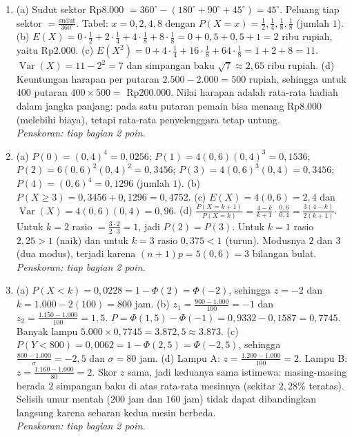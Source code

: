 \documentclass[a4paper,11pt]{article}
\newcounter{no}
\newcommand{\Var}{\operatorname{Var}}
\begin{document}
\par{}\par\vspace{0.2em}
\small\begin{enumerate}[leftmargin=2em,itemsep=3pt,topsep=2pt]
\item[\textbf{1.}] (a) Sudut sektor Rp8.000 $=360^\circ-(180^\circ+90^\circ+45^\circ)=45^\circ$. Peluang tiap sektor $=\frac{\text{sudut}}{360^\circ}$. Tabel: $x=0,2,4,8$ dengan $P(X=x)=\frac12,\frac14,\frac18,\frac18$ (jumlah $1$). (b) $E(X)=0\cdot\frac12+2\cdot\frac14+4\cdot\frac18+8\cdot\frac18=0+0{,}5+0{,}5+1=2$ ribu rupiah, yaitu Rp2.000. (c) $E(X^2)=0+4\cdot\frac14+16\cdot\frac18+64\cdot\frac18=1+2+8=11$. $\Var(X)=11-2^2=7$ dan simpangan baku $\sqrt7\approx2{,}65$ ribu rupiah. (d) Keuntungan harapan per putaran $2.500-2.000=500$ rupiah, sehingga untuk $400$ putaran $400\times500=$ Rp200.000. Nilai harapan adalah rata-rata hadiah dalam jangka panjang: pada satu putaran pemain bisa menang Rp8.000 (melebihi biaya), tetapi rata-rata penyelenggara tetap untung. \\ \textit{Penskoran: tiap bagian 2 poin.}
\item[\textbf{2.}] (a) $P(0)=(0{,}4)^4=0{,}0256$; $P(1)=4(0{,}6)(0{,}4)^3=0{,}1536$; $P(2)=6(0{,}6)^2(0{,}4)^2=0{,}3456$; $P(3)=4(0{,}6)^3(0{,}4)=0{,}3456$; $P(4)=(0{,}6)^4=0{,}1296$ (jumlah $1$). (b) $P(X\ge3)=0{,}3456+0{,}1296=0{,}4752$. (c) $E(X)=4(0{,}6)=2{,}4$ dan $\Var(X)=4(0{,}6)(0{,}4)=0{,}96$. (d) $\frac{P(X=k+1)}{P(X=k)}=\frac{4-k}{k+1}\cdot\frac{0{,}6}{0{,}4}=\frac{3(4-k)}{2(k+1)}$. Untuk $k=2$ rasio $=\frac{3\cdot2}{2\cdot3}=1$, jadi $P(2)=P(3)$. Untuk $k=1$ rasio $2{,}25>1$ (naik) dan untuk $k=3$ rasio $0{,}375<1$ (turun). Modusnya $2$ dan $3$ (dua modus), terjadi karena $(n+1)p=5(0{,}6)=3$ bilangan bulat. \\ \textit{Penskoran: tiap bagian 2 poin.}
\item[\textbf{3.}] (a) $P(X<k)=0{,}0228=1-\Phi(2)=\Phi(-2)$, sehingga $z=-2$ dan $k=1.000-2(100)=800$ jam. (b) $z_1=\frac{900-1.000}{100}=-1$ dan $z_2=\frac{1.150-1.000}{100}=1{,}5$. $P=\Phi(1{,}5)-\Phi(-1)=0{,}9332-0{,}1587=0{,}7745$. Banyak lampu $5.000\times0{,}7745=3.872{,}5\approx3.873$. (c) $P(Y<800)=0{,}0062=1-\Phi(2{,}5)=\Phi(-2{,}5)$, sehingga $\frac{800-1.000}{\sigma}=-2{,}5$ dan $\sigma=80$ jam. (d) Lampu A: $z=\frac{1.200-1.000}{100}=2$. Lampu B: $z=\frac{1.160-1.000}{80}=2$. Skor $z$ sama, jadi keduanya sama istimewa: masing-masing berada $2$ simpangan baku di atas rata-rata mesinnya (sekitar $2{,}28\%$ teratas). Selisih umur mentah ($200$ jam dan $160$ jam) tidak dapat dibandingkan langsung karena sebaran kedua mesin berbeda. \\ \textit{Penskoran: tiap bagian 2 poin.}

\end{enumerate}
\end{document}
